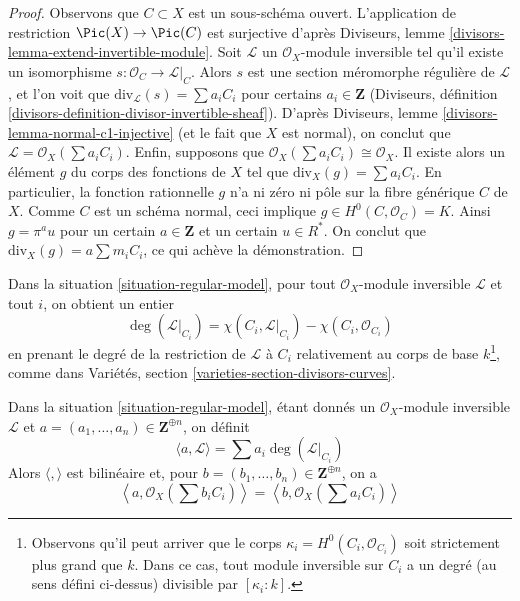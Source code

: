 \begin{proof}
Observons que $C \subset X$ est un sous-schéma ouvert. L'application de restriction
$\Pic(X) \to \Pic(C)$ est surjective d'après
Diviseurs, lemme \ref{divisors-lemma-extend-invertible-module}.
Soit $\mathcal{L}$ un $\mathcal{O}_X$-module inversible
tel qu'il existe un isomorphisme $s : \mathcal{O}_C \to \mathcal{L}|_C$.
Alors $s$ est une section méromorphe régulière de $\mathcal{L}$,
et l'on voit que $\text{div}_\mathcal{L}(s) = \sum a_i C_i$
pour certains $a_i \in \mathbf{Z}$
(Diviseurs, définition \ref{divisors-definition-divisor-invertible-sheaf}).
D'après Diviseurs, lemme \ref{divisors-lemma-normal-c1-injective}
(et le fait que $X$ est normal),
on conclut que $\mathcal{L} = \mathcal{O}_X(\sum a_iC_i)$.
Enfin, supposons que $\mathcal{O}_X(\sum a_i C_i) \cong \mathcal{O}_X$.
Il existe alors un élément $g$ du corps des fonctions de $X$
tel que $\text{div}_X(g) = \sum a_i C_i$. En particulier, la fonction rationnelle
$g$ n'a ni zéro ni pôle sur la fibre générique $C$ de $X$.
Comme $C$ est un schéma normal, ceci implique $g \in H^0(C, \mathcal{O}_C) = K$.
Ainsi $g = \pi^a u$ pour un certain $a \in \mathbf{Z}$ et un certain $u \in R^*$.
On conclut que $\text{div}_X(g) = a \sum m_i C_i$, ce qui achève
la démonstration.
\end{proof}

\noindent
Dans la situation \ref{situation-regular-model}, pour tout
$\mathcal{O}_X$-module inversible $\mathcal{L}$ et tout $i$, on obtient un entier
$$
\deg(\mathcal{L}|_{C_i}) =
\chi(C_i, \mathcal{L}|_{C_i}) - \chi(C_i, \mathcal{O}_{C_i})
$$
en prenant le degré de la restriction de $\mathcal{L}$ à $C_i$
relativement au corps de base $k$\footnote{Observons qu'il peut arriver
que le corps $\kappa_i = H^0(C_i, \mathcal{O}_{C_i})$ soit strictement plus grand
que $k$. Dans ce cas, tout module inversible sur $C_i$ a un
degré (au sens défini ci-dessus) divisible par $[\kappa_i : k]$.},
comme dans Variétés, section \ref{varieties-section-divisors-curves}.

\begin{lemma}
\label{lemma-intersection-pairing}
Dans la situation \ref{situation-regular-model}, étant donnés un
$\mathcal{O}_X$-module inversible $\mathcal{L}$ et
$a = (a_1, \ldots, a_n) \in \mathbf{Z}^{\oplus n}$, on définit
$$
\langle a, \mathcal{L} \rangle = \sum a_i\deg(\mathcal{L}|_{C_i})
$$
Alors $\langle , \rangle$ est bilinéaire et, pour
$b = (b_1, \ldots, b_n) \in \mathbf{Z}^{\oplus n}$, on a
$$
\left\langle a, \mathcal{O}_X(\sum b_i C_i) \right\rangle =
\left\langle b, \mathcal{O}_X(\sum a_i C_i) \right\rangle
$$
\end{lemma}

